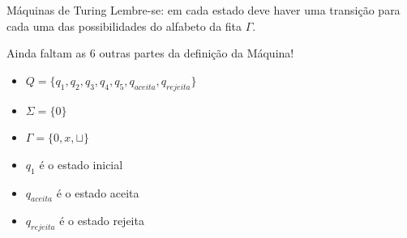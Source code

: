 \documentclass{beamer}
\begin{document}
\begin{frame}{Máquinas de Turing}
	Lembre-se: em cada estado deve haver uma transição para cada uma das possibilidades do alfabeto da fita $\Gamma$.
	\pause
	
	Ainda faltam as 6 outras partes da definição da Máquina!
	
	\begin{itemize}
		\item $Q = \{q_{1}, q_{2}, q_{3}, q_{4}, q_{5}, q_{aceita}, q_{rejeita}\}$\pause
		\item $\Sigma = \{0\}$\pause
		\item $\Gamma = \{0, x, \sqcup\}$\pause
		\item $q_{1}$ é o estado inicial\pause
		\item $q_{aceita}$ é o estado aceita\pause
		\item $q_{rejeita}$ é o estado rejeita
	\end{itemize}
\end{frame}
\end{document}
